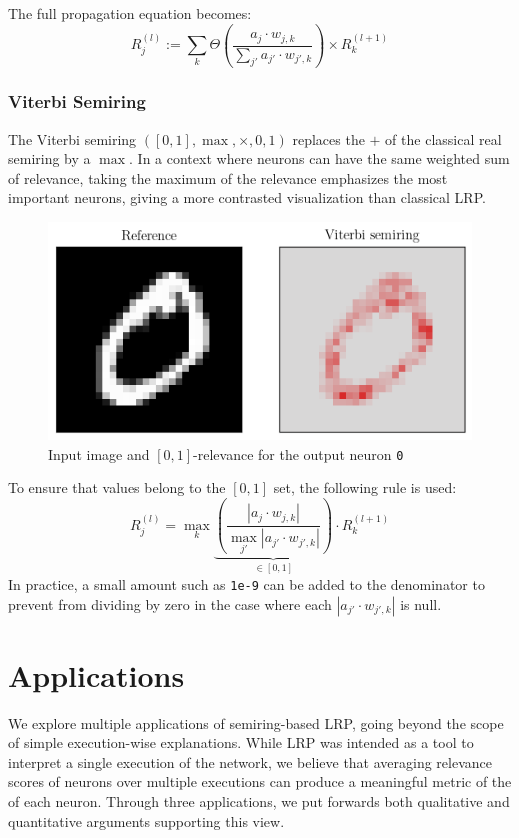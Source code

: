 \documentclass[twocolumn]{../cs-classes/cs-classes}
\newcommand*{\1}{\digitsbb{1}}
\newcommand*{\0}{\digitsbb{0}}
\begin{document}
The full propagation equation becomes:
\begin{equation}
    \tag{$\N$-LRP}
    R^{(l)}_j := \sum_{k}\Theta\left(\frac{a_j\cdot w_{j, k}}{\sum_{j'}a_{j'}\cdot w_{j', k}}\right) \times R^{(l+1)}_k
    \label{eq:counting-lrp}
\end{equation}

\subsubsection{Viterbi Semiring}
The Viterbi semiring $([0, 1], \max, \times, 0, 1)$ replaces the $+$ of the classical real semiring by a $\max$. In a context where neurons can have the same weighted sum of relevance, taking the maximum of the relevance emphasizes the most important neurons, giving a more contrasted visualization than classical LRP. 
\begin{figure}[H]
    \centering
    \includegraphics[width=.9\linewidth]{viterbi.png}
    \caption{Input image and $[0, 1]$-relevance for the output neuron \texttt{0}}
\end{figure}
To ensure that values belong to the $[0, 1]$ set, the following rule is used:
\begin{equation}
    R^{(l)}_j = \max_k \underbrace{\left(\frac{\left|a_j\cdot w_{j, k}\right|}{\max_{j'} \left|a_{j'}\cdot w_{j', k}\right|}\right)}_{\in[0, 1]} \cdot R^{(l+1)}_k
\end{equation}
In practice, a small amount such as \texttt{1e-9} can be added to the denominator to prevent from dividing by zero in the case where each $|a_{j'}\cdot w_{j',k}|$ is null.


\section{Applications}
We explore multiple applications of semiring-based LRP, going beyond the scope of simple execution-wise explanations. While LRP was intended as a tool to interpret a single execution of the network, we believe that averaging relevance scores of neurons over multiple executions can produce a meaningful metric of the  of each neuron. Through three applications, we put forwards both qualitative and quantitative arguments supporting this view.
\end{document}
